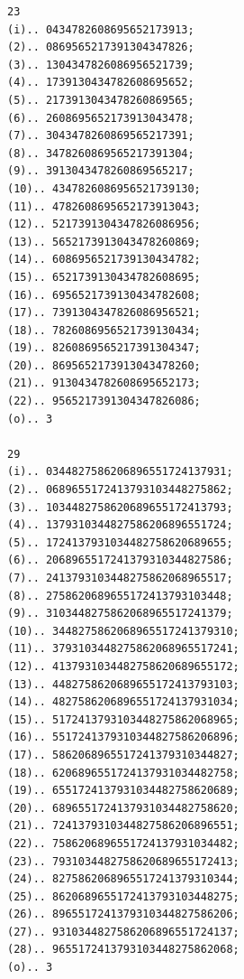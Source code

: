\documentclass[10pt,a4paper]{article}
\begin{document}
\begin{verbatim}
23
(i).. 0434782608695652173913;
(2).. 0869565217391304347826;
(3).. 1304347826086956521739;
(4).. 1739130434782608695652;
(5).. 2173913043478260869565;
(6).. 2608695652173913043478;
(7).. 3043478260869565217391;
(8).. 3478260869565217391304;
(9).. 3913043478260869565217;
(10).. 4347826086956521739130;
(11).. 4782608695652173913043;
(12).. 5217391304347826086956;
(13).. 5652173913043478260869;
(14).. 6086956521739130434782;
(15).. 6521739130434782608695;
(16).. 6956521739130434782608;
(17).. 7391304347826086956521;
(18).. 7826086956521739130434;
(19).. 8260869565217391304347;
(20).. 8695652173913043478260;
(21).. 9130434782608695652173;
(22).. 9565217391304347826086;
(o).. 3

29
(i).. 0344827586206896551724137931;
(2).. 0689655172413793103448275862;
(3).. 1034482758620689655172413793;
(4).. 1379310344827586206896551724;
(5).. 1724137931034482758620689655;
(6).. 2068965517241379310344827586;
(7).. 2413793103448275862068965517;
(8).. 2758620689655172413793103448;
(9).. 3103448275862068965517241379;
(10).. 3448275862068965517241379310;
(11).. 3793103448275862068965517241;
(12).. 4137931034482758620689655172;
(13).. 4482758620689655172413793103;
(14).. 4827586206896551724137931034;
(15).. 5172413793103448275862068965;
(16).. 5517241379310344827586206896;
(17).. 5862068965517241379310344827;
(18).. 6206896551724137931034482758;
(19).. 6551724137931034482758620689;
(20).. 6896551724137931034482758620;
(21).. 7241379310344827586206896551;
(22).. 7586206896551724137931034482;
(23).. 7931034482758620689655172413;
(24).. 8275862068965517241379310344;
(25).. 8620689655172413793103448275;
(26).. 8965517241379310344827586206;
(27).. 9310344827586206896551724137;
(28).. 9655172413793103448275862068;
(o).. 3
\end{verbatim}

\newpage
\setcounter{page}{414}
\end{document}
